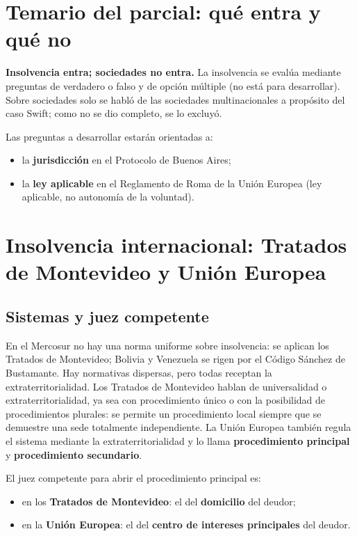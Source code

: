 \documentclass[12pt,oneside]{book}
\begin{document}
\section{Temario del parcial: qué entra y qué no}

\begin{important}
\textbf{Insolvencia entra; sociedades no entra.} La insolvencia se evalúa mediante preguntas de verdadero o falso y de opción múltiple (no está para desarrollar). Sobre sociedades solo se habló de las sociedades multinacionales a propósito del caso Swift; como no se dio completo, se lo excluyó.
\end{important}

Las preguntas a desarrollar estarán orientadas a:
\begin{itemize}
    \item la \textbf{jurisdicción} en el Protocolo de Buenos Aires;
    \item la \textbf{ley aplicable} en el Reglamento de Roma de la Unión Europea (ley aplicable, no autonomía de la voluntad).
\end{itemize}

\section{Insolvencia internacional: Tratados de Montevideo y Unión Europea}

\subsection{Sistemas y juez competente}

En el Mercosur no hay una norma uniforme sobre insolvencia: se aplican los Tratados de Montevideo; Bolivia y Venezuela se rigen por el Código Sánchez de Bustamante. Hay normativas dispersas, pero todas receptan la extraterritorialidad.
Los Tratados de Montevideo hablan de universalidad o extraterritorialidad, ya sea con procedimiento único o con la posibilidad de procedimientos plurales: se permite un procedimiento local siempre que se demuestre una sede totalmente independiente. La Unión Europea también regula el sistema mediante la extraterritorialidad y lo llama \textbf{procedimiento principal} y \textbf{procedimiento secundario}.

El juez competente para abrir el procedimiento principal es:
\begin{itemize}
    \item en los \textbf{Tratados de Montevideo}: el del \textbf{domicilio} del deudor;
    \item en la \textbf{Unión Europea}: el del \textbf{centro de intereses principales} del deudor.
\end{itemize}
\end{document}
